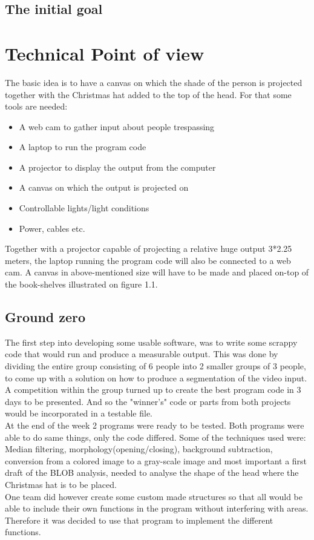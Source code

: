 \subsection{The initial goal}

\section{Technical Point of view}
The basic idea is to have a canvas on which the shade of the person is projected together with the Christmas hat added to the top of the head. For that some tools are needed:

\begin{itemize}
\item A web cam to gather input about people trespassing
\item A laptop to run the program code
\item A projector to display the output from the computer
\item A canvas on which the output is projected on
\item Controllable lights/light conditions
\item Power, cables etc.
\end{itemize}

Together with a projector capable of projecting a relative huge output 3*2.25 meters, the laptop running the program code will also be connected to a web cam. A canvas in above-mentioned size will have to be made and placed on-top of the book-shelves illustrated on figure 1.1. 

\subsection{Ground zero}
The first step into developing some usable software, was to write some scrappy code that would run and produce a measurable output. This was done by dividing the entire group consisting of 6 people into 2 smaller groups of 3 people, to come up with a solution on how to produce a segmentation of the video input. A competition within the group turned up to create the best program code in 3 days to be presented. And so the "winner's" code or parts from both projects would be incorporated in a testable file.\\
At the end of the week 2 programs were ready to be tested. Both programs were able to do same things, only the code differed. Some of the techniques used were: Median filtering, morphology(opening/closing), background subtraction, conversion from a colored image to a gray-scale image and most important a first draft of the BLOB analysis, needed to analyse the shape of the head where the Christmas hat is to be placed.\\
One team did however create some custom made structures so that all would be able to include their own functions in the program without interfering with areas. Therefore it was decided to use that program to implement the different functions.

